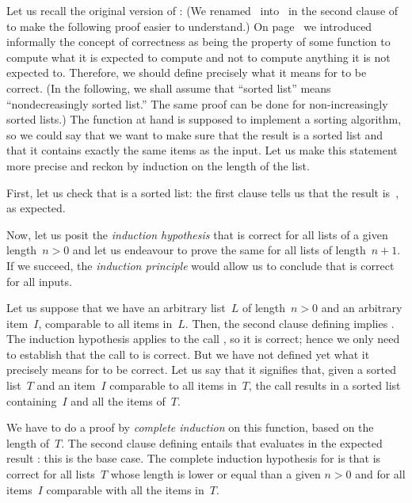 Let us recall the original version of :
 (We renamed~ into~ in
the second clause of  to make the following proof
easier to understand.) On page~\pageref{correctness} we introduced
informally the concept of correctness as being the property of some
function to compute what it is expected to compute and not to compute
anything it is not expected to. Therefore, we should define precisely
what it means for  to be correct. (In the following,
we shall assume that ``sorted list'' means ``nondecreasingly sorted
list.'' The same proof can be done for non\hyp{}increasingly sorted
lists.) The function at hand is supposed to implement a sorting
algorithm, so we could say that we want to make sure that the result
is a sorted list and that it contains exactly the same items as the
input. Let us make this statement more precise and reckon by induction
on the length of the list.

First, let us check that  is a sorted list: the
first clause tells us that the result is~\erlcode{[]}, as expected.

Now, let us posit the \emph{induction hypothesis} that
 is correct for all lists of a given length~\(n>0\)
and let us endeavour to prove the same for all lists of
length~\(n+1\). If we succeed, the \emph{induction principle} would
allow us to conclude that  is correct for all inputs.

Let us suppose that we have an arbitrary list~\(L\) of
length~\({n>0}\) and an arbitrary item~\(I\), comparable to all items
in~\(L\). Then, the second clause defining  implies
. The induction hypothesis applies
to the call , so it is correct; hence we only
need to establish that the call to  is correct. But
we have not defined yet what it precisely means for 
to be correct. Let us say that it signifies that, given a sorted
list~\(T\) and an item~\(I\) comparable to all items in~\(T\), the
call  results in a sorted list
containing~\(I\) and all the items of~\(T\).

We have to do a proof by \emph{complete induction} on this function,
based on the length of~\(T\). The second clause defining
 entails that  evaluates
in the expected result \erlcode{[\(I\)]}: this is the base case. The
complete induction hypothesis for  is that
 is correct for all lists~\(T\) whose
length is lower or equal than a given \(n>0\) and for all items~\(I\)
comparable with all the items in~\(T\).

